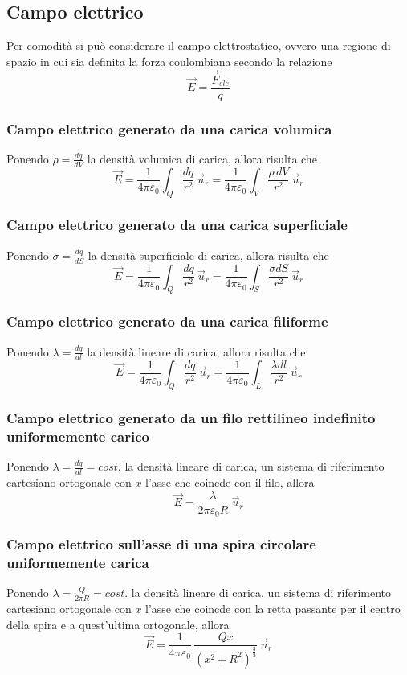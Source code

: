 \documentclass[12pt,a4paper]{report}
\begin{document}
		\subsection{Campo elettrico}
Per comodità si può considerare il campo elettrostatico, ovvero una regione di spazio in cui sia definita la forza coulombiana secondo la relazione 
	\[\vec{E}= \frac{\vec{F}_{ele}}{q}\]
		\subsubsection{Campo elettrico generato da una carica volumica}
Ponendo $\rho = \frac{dq}{dV}$ la densità volumica di carica, allora risulta che
		\[ \vec{E} = \frac{1}{4 \pi \varepsilon_{0}} \int_{Q} \frac{dq}{r^{2}} ~\vec{u}_{r}=\frac{1}{4 \pi \varepsilon_{0}} \int_{V} \frac{\rho \, dV}{r^{2}} ~\vec{u}_{r}\]
		\subsubsection{Campo elettrico generato da una carica superficiale}
Ponendo $\sigma = \frac{dq}{dS}$ la densità superficiale di carica, allora risulta che
		\[ \vec{E} = \frac{1}{4 \pi \varepsilon_{0}} \int_{Q} \frac{dq}{r^{2}} ~\vec{u}_{r}=\frac{1}{4 \pi \varepsilon_{0}} \int_{S} \frac{\sigma dS}{r^{2}} ~\vec{u}_{r} \]
		\subsubsection{Campo elettrico generato da una carica filiforme}
Ponendo $\lambda = \frac{dq}{dl}$ la densità lineare di carica, allora risulta che
		\[ \vec{E} = \frac{1}{4 \pi \varepsilon_{0}} \int_{Q} \frac{dq}{r^{2}} ~\vec{u}_{r}=\frac{1}{4 \pi \varepsilon_{0}} \int_{L} \frac{\lambda dl}{r^{2}} ~\vec{u}_{r} \]
		\subsubsection{Campo elettrico generato da un filo rettilineo indefinito uniformemente carico}
Ponendo $\lambda = \frac{dq}{dl}=cost.$ la densità lineare di carica, un sistema di riferimento cartesiano ortogonale con $x$ l'asse che coincde con il filo, allora
		\[ \vec{E} = \frac{\lambda}{2 \pi \varepsilon_{0} R} ~ \vec{u}_{r} \]
		\subsubsection{Campo elettrico sull'asse di una spira circolare uniformemente carica}
Ponendo $\lambda = \frac{Q}{2 \pi R}= cost.$ la densità lineare di carica, un sistema di riferimento cartesiano ortogonale con $x$ l'asse che coincde con la retta passante per il centro della spira e a quest'ultima ortogonale, allora
		\[ \vec{E} = \frac{1}{4 \pi \varepsilon_{0}}\, \frac{Qx}{(x^{2}+R^{2})^{\frac{3}{2}}} ~ \vec{u}_{r} \]
\end{document}
